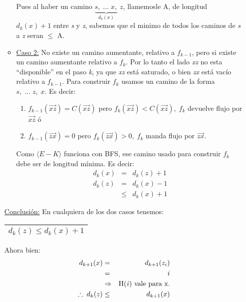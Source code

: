 \documentclass[12pt,a4paper]{report}
\begin{document}
\begin{enumerate}
\begin{itemize}
							\vspace{2mm}
							\par Pues al haber un camino $\underbrace{s, \; \dotsc \; x,}_{d_{k}(x)} \; z$, llamemosle A, de longitud $d_{k}(x) + 1$ entre \textit{s} y \textit{z}, sabemos que el minimo de todos los caminos de \textit{s} a \textit{z} seran $\leq$ A.
						\item \underline{Caso 2:} No existe un camino aumentante, relativo a $f_{k - 1}$, pero si existe un camino aumentante relativo a $f_{k}$. Por lo tanto el lado \textit{xz} no esta \textquotedblleft disponible\textquotedblright \; en el paso \textit{k}, ya que \textit{xz} está saturado, o bien \textit{zx} está vacío relativo a $f_{k - 1}$. Para construir $f_{k}$ usamos un camino de la forma $s, \; \dotsc \; z, \; x$. Es decir:
							\begin{enumerate}[1)]
								\item $f_{k - 1}(\overrightarrow{xz}) = C(\overrightarrow{xz})$ pero $f_{k}(\overrightarrow{xz}) < C(\overrightarrow{xz}), \; f_{k}$ devuelve flujo por $\overrightarrow{xz}$ ó
								\item $f_{k - 1}(\overrightarrow{zx}) = 0$ pero $f_{k}(\overrightarrow{zx}) > 0, \; f_{k}$ manda flujo por $\overrightarrow{zx}$.
							\end{enumerate}

							\par Como $\langle E-K \rangle$ funciona con BFS, ese camino usado para construir $f_{k}$ debe ser de longitud mínima. Es decir:
							\begin{eqnarray}
								\nonumber d_{k}(x) &=& d_{k}(z) + 1 \\
								\nonumber d_{k}(z) &=& d_{k}(x) - 1 \\
								\nonumber &\leq & d_{k}(x) + 1
							\end{eqnarray}
					\end{itemize}

				\underline{Conclusión:} En cualquiera de los dos casos tenemos:
				\begin{center}
					\begin{tabular}{|c|} \hline $d_{k}(z) \leq d_{k}(x) + 1$ \\\hline \end{tabular}
				\end{center}

				\par Ahora bien:
				\begin{eqnarray}
					\nonumber d_{k + 1}(x) &=& d_{k + 1}(z_{i}) \\
					\nonumber &=& i \\
					\nonumber &\Rightarrow & \textup{H(\textit{i}) vale para x.} \\
					\nonumber \therefore \; d_{k}(z) & \leq & d_{k + 1}(x)
				\end{eqnarray}


\end{enumerate}
\end{document}
